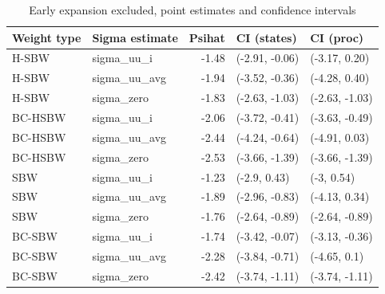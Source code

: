 \documentclass{article}
\begin{document}
\begin{appendix}
\begin{table}[ht]
\centering
\caption{Early expansion excluded, point estimates and confidence intervals}
\label{tab:confintmainc2}
\begin{tabular}{llrll}
  \hline
Weight type & Sigma estimate & Psihat & CI (states) & CI (proc) \\ 
  \hline
H-SBW & sigma\_uu\_i & -1.48 & (-2.91, -0.06) & (-3.17, 0.20) \\ 
  H-SBW & sigma\_uu\_avg & -1.94 & (-3.52, -0.36) & (-4.28, 0.40) \\ 
  H-SBW & sigma\_zero & -1.83 & (-2.63, -1.03) & (-2.63, -1.03) \\ 
  BC-HSBW & sigma\_uu\_i & -2.06 & (-3.72, -0.41) & (-3.63, -0.49) \\ 
  BC-HSBW & sigma\_uu\_avg & -2.44 & (-4.24, -0.64) & (-4.91, 0.03) \\ 
  BC-HSBW & sigma\_zero & -2.53 & (-3.66, -1.39) & (-3.66, -1.39) \\ 
  SBW & sigma\_uu\_i & -1.23 & (-2.9, 0.43) & (-3, 0.54) \\ 
  SBW & sigma\_uu\_avg & -1.89 & (-2.96, -0.83) & (-4.13, 0.34) \\ 
  SBW & sigma\_zero & -1.76 & (-2.64, -0.89) & (-2.64, -0.89) \\ 
  BC-SBW & sigma\_uu\_i & -1.74 & (-3.42, -0.07) & (-3.13, -0.36) \\ 
  BC-SBW & sigma\_uu\_avg & -2.28 & (-3.84, -0.71) & (-4.65, 0.1) \\ 
  BC-SBW & sigma\_zero & -2.42 & (-3.74, -1.11) & (-3.74, -1.11) \\ 
   \hline
\end{tabular}
\end{table}


\end{appendix}
\end{document}
